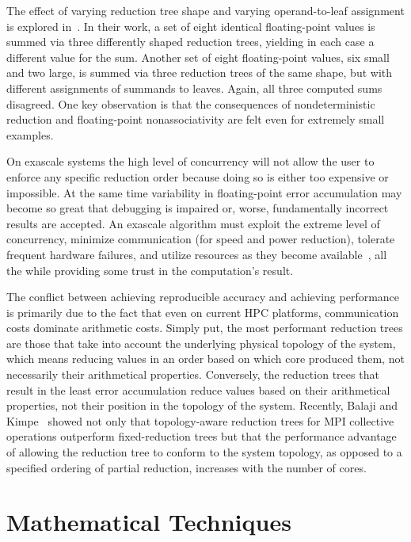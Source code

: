 The effect of varying reduction tree shape and varying operand-to-leaf
assignment is explored in~\cite{chiang13}. In their work, a set of
eight identical floating-point values is summed via three differently
shaped reduction trees, yielding in each case a different value for
the sum. Another set of eight floating-point values, six small and two
large, is summed via three reduction trees of the same shape, but with
different assignments of summands to leaves. Again, all three computed
sums disagreed.  One key observation is that the consequences of
nondeterministic reduction and floating-point nonassociativity are
felt even for extremely small examples.

On exascale systems the high level of concurrency will not allow the
user to enforce any specific reduction order because doing so is
either too expensive or impossible. At the same time variability in
floating-point error accumulation may become so great that debugging
is impaired or, worse, fundamentally incorrect results are
accepted. An exascale algorithm must exploit the extreme level of
concurrency, minimize communication (for speed and power reduction),
tolerate frequent hardware failures, and utilize resources as they
become available~\cite{Doe2014}, all the while providing some trust in
the computation's result.

The conflict between achieving reproducible accuracy and achieving
performance is primarily due to the fact that even on current HPC
platforms, communication costs dominate arithmetic costs.  Simply put,
the most performant reduction trees are those that take into account
the underlying physical topology of the system, which means reducing
values in an order based on which core produced them, not necessarily
their arithmetical properties. Conversely, the reduction trees that
result in the least error accumulation reduce values based on their
arithmetical properties, not their position in the topology of the
system. Recently, Balaji and Kimpe~\cite{balaji13} showed not only
that topology-aware reduction trees for MPI collective operations
outperform fixed-reduction trees but that the performance advantage of
allowing the reduction tree to conform to the system topology, as
opposed to a specified ordering of partial reduction, increases with
the number of cores.

\section{Mathematical Techniques}


